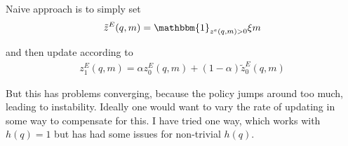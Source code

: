 \documentclass[12pt,english]{article}
\theoremstyle{remark}
\begin{document}
Naive approach is to simply set 
\begin{align*}
\tilde{z}^E(q,m) = \mathbbm{1}_{z^e(q,m) > 0}\xi m  
\end{align*}

and then update according to 
\begin{align*}
z^E_1(q,m) = \alpha z^E_0(q,m) + (1- \alpha) \tilde{z}^E_0 (q,m) 
\end{align*}
	
But this has problems converging, because the policy jumps around too much, leading to instability. Ideally one would want to vary the rate of updating in some way to compensate for this. I have tried one way, which works with $h(q) = 1$ but has had some issues for non-trivial $h(q)$. 
	
	
	
	
	
	
	
	
\end{document}
